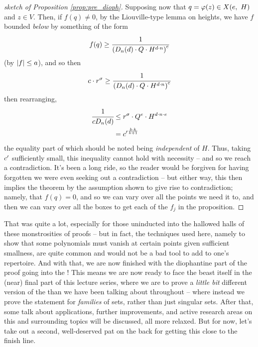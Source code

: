 \begin{proof}[sketch of Proposition \ref{prop:pre_dioph}]
      Supposing now that $q = \phi(z) \in \XeH[H]{e}$ and $z \in V$. Then, if $f(q) \neq 0$, by the Liouville-type lemma on heights, we have $f$ bounded \emph{below} by something of the form
        \begin{align*}
          f(q) \geq \cfrac{1}{\left(D_n(d) \cdot Q \cdot H^{d \cdot n}\right)^e}
        \end{align*}
      (by $\norm{f} \leq a$), and so then
        \begin{align*}
          c \cdot r^{\sigma} \geq \cfrac{1}{\left(D_n(d) \cdot Q \cdot H^{d \cdot n}\right)^e}
        \end{align*}
      then rearranging, 
        \begin{align*}
          \cfrac{1}{c D_n(d)} &\leq r^{\sigma} \cdot Q^e \cdot H^{d \cdot n \cdot e} \\
                              &= {c^{\prime}}^{\frac{b \cdot k}{k + 1}}
        \end{align*}
      the equality part of which should be noted being \emph{independent} of $H$. Thus, taking $\pri{c}$ sufficiently small, this inequality cannot hold with necessity -- and so we reach a contradiction. It's been a long ride, so the reader would be forgiven for having forgotten we were even seeking out a contradiction -- but either way, this then implies the theorem by the assumption shown to give rise to contradiction; namely, that $f(q) = 0$, and so we can vary over all the points we need it to, and then we can vary over all the boxes to get each of the $f_j$ in the proposition.
\end{proof}

That was quite a lot, especially for those uninducted into the hallowed halls of these monstrosities of proofs -- but in fact, the techniques used here, namely to show that some polynomials must vanish at certain points given sufficient smallness, are quite common and would not be a bad tool to add to one's repertoire. And with that, we are now finished with the diophantine part of the proof going into the \pwt! This means we are now ready to face the beast itself in the (near) final part of this lecture series, where we are to prove a \emph{little bit} different version of the \pwt than we have been talking about throughout -- where instead we prove the statement for \emph{families} of  sets, rather than just singular  sets. After that, some talk about applications, further improvements, and active research areas on this and surrounding topics will be discussed, all more relaxed. But for now, let's take out a second, well-deserved pat on the back for getting this close to the finish line.